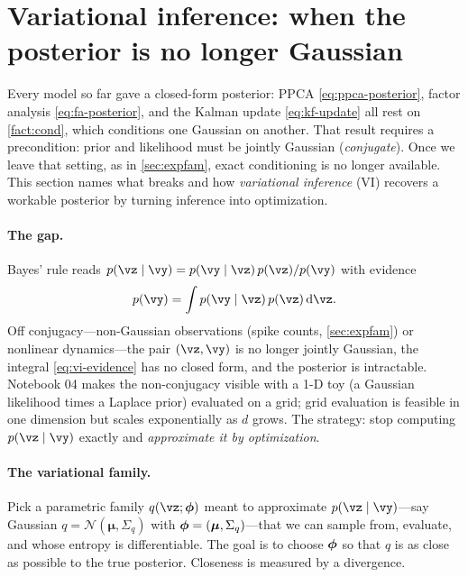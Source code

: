 \documentclass[11pt]{article}
\theoremstyle{plain}
\theoremstyle{definition}
\theoremstyle{remark}
\theoremstyle{definition}
\newcommand{\Normal}{\mathcal{N}}
\newcommand{\vmu}{\bm{\mu}}
\begin{document}
\section{Variational inference: when the posterior is no longer Gaussian}\label{sec:vi}

Every model so far gave a closed-form posterior: PPCA
\eqref{eq:ppca-posterior}, factor analysis \eqref{eq:fa-posterior}, and the Kalman
update \eqref{eq:kf-update} all rest on \cref{fact:cond}, which conditions one
Gaussian on another. That result requires a precondition: prior and likelihood
must be jointly Gaussian (\emph{conjugate}). Once we leave that setting, as in
\cref{sec:expfam}, exact conditioning is no longer available. This section names what breaks and how
\emph{variational inference} (VI) recovers a workable posterior by turning
inference into optimization.

\paragraph{The gap.} Bayes' rule reads $p(\vz\mid\vy) = p(\vy\mid\vz)\,p(\vz) /
p(\vy)$ with evidence
\begin{equation}\label{eq:vi-evidence}
    p(\vy) = \int p(\vy\mid\vz)\,p(\vz)\,\mathrm{d}\vz .
\end{equation}
Off conjugacy---non-Gaussian observations (spike counts, \cref{sec:expfam}) or
nonlinear dynamics---the pair $(\vz,\vy)$ is no longer jointly Gaussian, the
integral \eqref{eq:vi-evidence} has no closed form, and the posterior is
intractable. Notebook 04 makes the non-conjugacy visible with a 1-D toy (a
Gaussian likelihood times a Laplace prior) evaluated on a grid; grid evaluation is
feasible in one dimension but scales exponentially as $d$ grows. The strategy: stop
computing $p(\vz\mid\vy)$ exactly and \emph{approximate it by optimization}.

\paragraph{The variational family.} Pick a parametric family $q(\vz;\vphi)$
meant to approximate $p(\vz\mid\vy)$---say Gaussian $q = \Normal(\vmu, \Sigma_q)$
with $\vphi = (\vmu, \Sigma_q)$---that we can sample from, evaluate, and whose
entropy is differentiable. The goal is to choose $\bm{\phi}$ so that $q$ is as close as
possible to the true posterior. Closeness is measured by a divergence.
\end{document}

